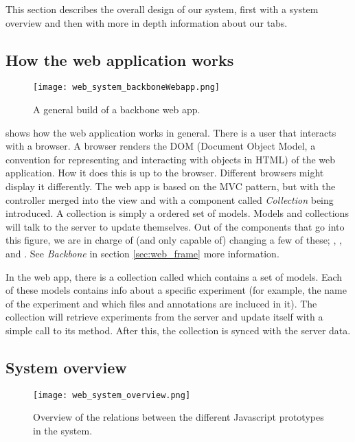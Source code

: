 This section describes the overall design of our system, first with a system overview and then with more in depth information about our tabs.
\subsection{How the web application works}
\begin{figure}[h]
\centering
\texttt{[image: web\_system\_backboneWebapp.png]}
\caption{\label{fig:web_system_backboneWebapp}A general build of a backbone web app.}
\end{figure}

 shows how the web application works in general. There is a user that interacts with a browser. A browser renders the DOM (Document Object Model, a convention for representing and interacting with objects in HTML) of the web application. How it does this is up to the browser. Different browsers might display it differently. The web app is based on the MVC pattern, but with the controller merged into the view and with a component called \textit{Collection} being introduced. A collection is simply a ordered set of models. Models and collections will talk to the server to update themselves. Out of the components that go into this figure, we are in charge of (and only capable of) changing a few of these; , ,  and . See \textit{Backbone} in section \ref{sec:web_frame} more information.

\begin{example}
In the web app, there is a collection called  which contains a set of  models. Each of these models contains info about a specific experiment (for example, the name of the experiment and which files and annotations are incluced in it). The collection will retrieve experiments from the server and update itself with a simple call to its  method. After this, the collection is synced with the server data.
\end{example}

\subsection{System overview}
\begin{figure}[h]
\centering
\texttt{[image: web\_system\_overview.png]}
\caption{\label{fig:web_system_overview}Overview of the relations between the different Javascript prototypes in the system.}
\end{figure}

